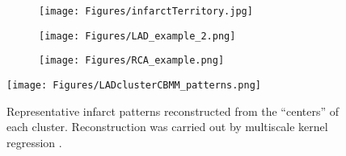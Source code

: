 \begin{figure}[!h]
\centering
\begin{subfigure}[t]{0.32\textwidth}
  \centering
  \texttt{[image: Figures/infarctTerritory.jpg]}
  \captionsetup{width=.9\linewidth}
  \caption{}
  \label{fig:territory}
\end{subfigure}%
\begin{subfigure}[t]{0.32\textwidth}
  \centering
  \texttt{[image: Figures/LAD\_example\_2.png]}
  \captionsetup{width=.9\linewidth}
  \caption{}
  \label{fig:LAD example}
\end{subfigure}
\begin{subfigure}[t]{0.32\textwidth}
  \centering
  \texttt{[image: Figures/RCA\_example.png]}
  \captionsetup{width=.9\linewidth}
  \caption{}
  \label{fig:RCA example}
\end{subfigure}
\caption{}
\label{fig:Left ventricular territories and two example}
\end{figure}

\begin{figure}[!h]
    \centering
    \centering
    \texttt{[image: Figures/LADclusterCBMM\_patterns.png]}
    \label{fig:typical patterns GMM}
    \caption{Representative infarct patterns reconstructed from the ``centers'' of each cluster. Reconstruction was carried out by multiscale kernel regression \cite{duchateau2013adaptation}.}
    \label{fig:typical patterns}
\end{figure}
